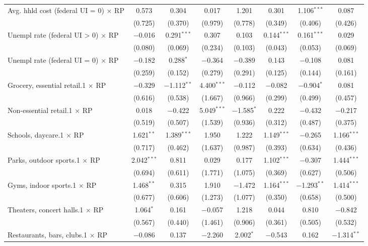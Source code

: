 \begin{table}[!htbp]
\begin{tabular}{@{\extracolsep{5pt}}lccccccc}
  Avg. hhld cost (federal UI = 0) $\times$ RP & 0.573 & 0.304 & 0.017 & 1.201 & 0.301 & 1.106$^{***}$ & 0.087 \\ 
  & (0.725) & (0.370) & (0.979) & (0.778) & (0.349) & (0.406) & (0.426) \\ 
  Unempl rate (federal UI > 0) $\times$ RP & $-$0.016 & 0.291$^{***}$ & 0.307 & 0.103 & 0.144$^{***}$ & 0.161$^{***}$ & 0.029 \\ 
  & (0.080) & (0.069) & (0.234) & (0.103) & (0.043) & (0.053) & (0.069) \\ 
  Unempl rate (federal UI = 0) $\times$ RP & $-$0.182 & 0.288$^{*}$ & $-$0.364 & $-$0.389 & 0.143 & $-$0.108 & 0.081 \\ 
  & (0.259) & (0.152) & (0.279) & (0.291) & (0.125) & (0.144) & (0.161) \\ 
  Grocery, essential retail.1 $\times$ RP & $-$0.329 & $-$1.112$^{**}$ & 4.400$^{***}$ & $-$0.112 & $-$0.082 & $-$0.904$^{*}$ & 0.081 \\ 
  & (0.616) & (0.538) & (1.667) & (0.966) & (0.299) & (0.499) & (0.457) \\ 
  Non-essential retail.1 $\times$ RP & 0.018 & $-$0.422 & 5.049$^{***}$ & $-$1.585$^{*}$ & 0.222 & $-$0.432 & $-$0.217 \\ 
  & (0.519) & (0.507) & (1.539) & (0.936) & (0.312) & (0.487) & (0.375) \\ 
  Schools, daycare.1 $\times$ RP & 1.621$^{**}$ & 1.389$^{***}$ & 1.950 & 1.222 & 1.149$^{***}$ & $-$0.265 & 1.166$^{***}$ \\ 
  & (0.717) & (0.462) & (1.637) & (0.987) & (0.393) & (0.634) & (0.436) \\ 
  Parks, outdoor sports.1 $\times$ RP & 2.042$^{***}$ & 0.811 & 0.029 & 0.177 & 1.102$^{***}$ & $-$0.307 & 1.444$^{***}$ \\ 
  & (0.694) & (0.611) & (1.771) & (1.075) & (0.369) & (0.627) & (0.506) \\ 
  Gyms, indoor sports.1 $\times$ RP & 1.468$^{**}$ & 0.315 & 1.910 & $-$1.472 & 1.164$^{***}$ & $-$1.293$^{**}$ & 1.414$^{***}$ \\ 
  & (0.677) & (0.606) & (1.273) & (1.077) & (0.350) & (0.658) & (0.500) \\ 
  Theaters, concert halls.1 $\times$ RP & 1.064$^{*}$ & 0.161 & $-$0.057 & 1.218 & 0.044 & 0.810 & $-$0.842 \\ 
  & (0.567) & (0.440) & (1.461) & (0.906) & (0.361) & (0.505) & (0.532) \\ 
  Restaurants, bars, clubs.1 $\times$ RP & $-$0.086 & 0.137 & $-$2.260 & 2.002$^{*}$ & $-$0.543 & 0.162 & $-$1.314$^{**}$ \\ 

\end{tabular}
\end{table}
